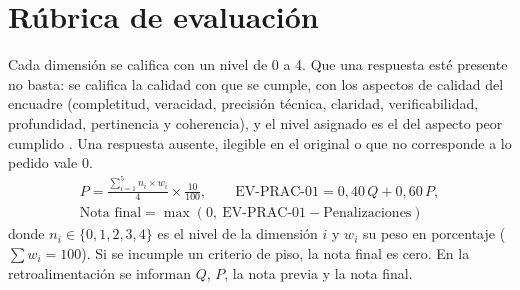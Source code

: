 \documentclass[11pt]{article}
\newcommand{\seccion}[1]{\section{\textcolor{utegreendk}{#1}}}
\begin{document}
\seccion{Rúbrica de evaluación}

Cada dimensión se califica con un nivel de 0 a 4. Que una respuesta esté presente no basta: se califica la calidad con que se cumple, con los aspectos de calidad del encuadre (completitud, veracidad, precisión técnica, claridad, verificabilidad, profundidad, pertinencia y coherencia), y el nivel asignado es el del aspecto peor cumplido \citep{brookhart_2018,panadero_jonsson_2020}. Una respuesta ausente, ilegible en el original o que no corresponde a lo pedido vale 0.
\begin{gather*}
	P = \frac{\sum_{i=1}^{5} n_i \times w_i}{4} \times \frac{10}{100}, \qquad \text{EV-PRAC-01} = 0{,}40\,Q + 0{,}60\,P,\\
	\text{Nota final} = \max(0,\ \text{EV-PRAC-01} - \text{Penalizaciones})
\end{gather*}
donde $n_i \in \{0,1,2,3,4\}$ es el nivel de la dimensión $i$ y $w_i$ su peso en porcentaje ($\sum w_i = 100$). Si se incumple un criterio de piso, la nota final es cero. En la retroalimentación se informan $Q$, $P$, la nota previa y la nota final.
\end{document}
